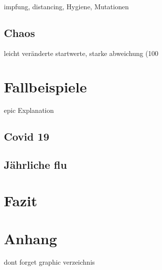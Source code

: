 \documentclass[12pt]{scrartcl} %
\begin{document}
impfung, distancing, Hygiene, Mutationen


\subsection{Chaos}

leicht veränderte startwerte, starke abweichung (100%


\newpage
\section{Fallbeispiele}

epic Explanation


\subsection{Covid 19}


\subsection{Jährliche flu}

\newpage %
\section{Fazit}


\newpage
\section{Anhang}

dont forget graphic verzeichnis


\newpage
\setlength{\bibitemsep}{\baselineskip}
\printbibliography[heading=bibintoc]
\end{document}
